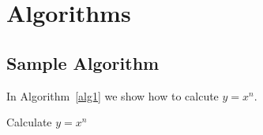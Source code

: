 \chapter{Algorithms}\label{ch:algorithms}

\section{Sample Algorithm}
In Algorithm~\ref{alg1} we show how to calcute $y=x^n$.

\begin{algorithm}
  \caption{Calculate $y = x^n$}
  \label{alg1}
  \begin{algorithmic}
    
  \end{algorithmic}
\end{algorithm}

\endinput
